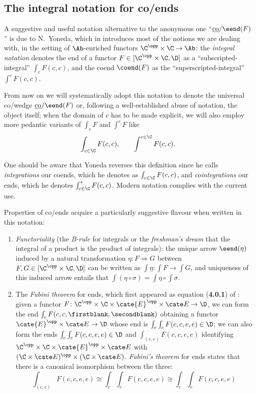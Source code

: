 \subsection{The integral notation for co/ends}\label{the_integral_not}
A suggestive and useful notation alternative to the anonymous one ``$\underline{\text{co}}/\eend(F)$'' is due to N\@.~Yoneda, which in \cite{yoneda} introduces most of the notions we are dealing with, in the setting of $\Ab$\hyp{}enriched functors $\C^\opp\times \C\to \Ab$: the \emph{integral notation} denotes the end of a functor $F\in [\C^\opp\times \C,\D]$ as a ``subscripted\hyp{}integral'' $\int_cF(c,c)$, and the coend $\coend(F)$ as the ``superscripted\hyp{}integral'' $\int^cF(c,c)$.

From now on we will systematically adopt this notation to denote the universal co/wedge $\underline{\text{co}}/\eend(F)$ or, following a well\hyp{}established abuse of notation, the object itself; when the domain of $c$ has to be made explicit, we will also employ more pedantic variants of $\int_c F$ and $\int^c F$ like
\[
\int_{c\in \C} F(c,c), \qquad \int^{c\in \C} F(c,c).
\]
\begin{remark}
One should be aware that Yoneda reverses this definition since he calls \emph{integrations} our coends, which he denotes as $\int_{c\in\C} F(c,c)$, and \emph{cointegrations} our ends, which he denotes $\int_{c\in\C}^*F(c,c)$. Modern notation complies with the current use.
\end{remark}
\begin{remark}
Properties of co/ends acquire a particularly suggestive flavour when written in this notation:
\begin{enumerate}[label=\oldstylenums{\arabic*})]\label{properties}
\item \emph{Functoriality} (the \emph{B-rule} for integrals or the \emph{freshman's dream} that the integral of a product is the product of integrals): the unique arrow $\eend(\eta)$ induced by a natural transformation $\eta\colon F\Rightarrow G$ between $F,G\in[ \C^\opp \times \C ,\D]$ can be written as $\int\eta\colon \int F\to \int G$, and uniqueness of this induced arrow entails that $\int (\eta\circ\sigma)=\int \eta\circ\int \sigma$.
\item The \emph{Fubini theorem} for ends, which first appeared as equation (\textbf{4.0.1}) of \cite{yoneda}: given a functor $F\colon \C^\opp\times\C\times \cate{E}^\opp\times \cate E\to \D$, we can form the end $\int_cF(c,c,\firstblank,\secondblank)$ obtaining a functor $\cate{E}^\opp\times \cate E\to \D$ whose end is $\int_e\int_cF(c,c,e,e)\in \D$; we can also form the ends $\int_c\int_e F(c,c,e,e)\in \D$ and $\int_{(c,e)}F(c,c,e,e)$ identifying $\C^\opp\times\C\times \cate{E}^\opp\times \cate E$ with $(\C\times\cate E)^\opp\times (\C\times\cate E)$. \emph{Fubini's theorem} for ends states that there is a canonical isomorphism between the three:
\[
\int_{(c,e)}F(c,c,e,e)\cong 
\int_e\int_cF(c,c,e,e)\cong 
\int_c\int_e F(c,c,e,e)
\]
\end{enumerate}
\end{remark}

